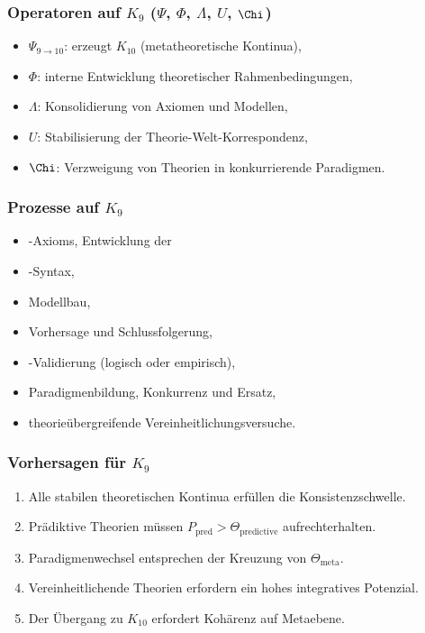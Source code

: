 \subsubsection{Operatoren auf \texorpdfstring{$K_9$}{K_9} (\texorpdfstring{$\Psi$}{\Psi}, \texorpdfstring{$\Phi$}{\Phi}, \texorpdfstring{$\Lambda$}{\Lambda}, \texorpdfstring{$U$}{U}, \texorpdfstring{$\Chi$}{\Chi})}

\begin{itemize}
    \item $\Psi_{9\to10}$: erzeugt $K_{10}$ (metatheoretische Kontinua),
    \item $\Phi$: interne Entwicklung theoretischer Rahmenbedingungen,
    \item $\Lambda$: Konsolidierung von Axiomen und Modellen,
    \item $U$: Stabilisierung der Theorie-Welt-Korrespondenz,
    \item $\Chi$: Verzweigung von Theorien in konkurrierende Paradigmen.
\end{itemize}

\subsubsection{Prozesse auf \texorpdfstring{$K_9$}{K_9}}

\begin{itemize}
    Auswahl und Überarbeitung des \item-Axioms,
    Entwicklung der \item-Syntax,
    \item Modellbau,
    \item Vorhersage und Schlussfolgerung,
    \item-Validierung (logisch oder empirisch),
    \item Paradigmenbildung, Konkurrenz und Ersatz,
    \item theorieübergreifende Vereinheitlichungsversuche.
\end{itemize}

\subsubsection{Vorhersagen für \texorpdfstring{$K_9$}{K_9}}

\begin{enumerate}
    \item Alle stabilen theoretischen Kontinua erfüllen die Konsistenzschwelle.
    \item Prädiktive Theorien müssen $P_{\mathrm{pred}} > \Theta_{\mathrm{predictive}}$ aufrechterhalten.
    \item Paradigmenwechsel entsprechen der Kreuzung von $\Theta_{\mathrm{meta}}$.
    \item Vereinheitlichende Theorien erfordern ein hohes integratives Potenzial.
    \item Der Übergang zu $K_{10}$ erfordert Kohärenz auf Metaebene.
\end{enumerate}

